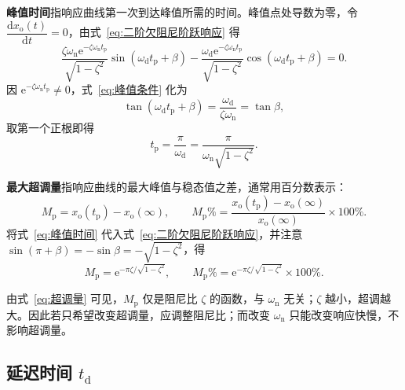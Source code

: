 \textbf{峰值时间}指响应曲线第一次到达峰值所需的时间。峰值点处导数为零，令 $\dfrac{\mathrm{d}x_{\mathrm{o}}(t)}{\mathrm{d}t}=0$，由式~\eqref{eq:二阶欠阻尼阶跃响应} 得
\begin{equation}
\frac{\zeta\omega_{\mathrm{n}}\mathrm{e}^{-\zeta\omega_{\mathrm{n}}t_{\mathrm{p}}}}{\sqrt{1-\zeta^{2}}}
\sin\left(\omega_{\mathrm{d}}t_{\mathrm{p}}+\beta\right)
-\frac{\omega_{\mathrm{d}}\mathrm{e}^{-\zeta\omega_{\mathrm{n}}t_{\mathrm{p}}}}{\sqrt{1-\zeta^{2}}}
\cos\left(\omega_{\mathrm{d}}t_{\mathrm{p}}+\beta\right)=0.
\label{eq:峰值条件}
\end{equation}
因 $\mathrm{e}^{-\zeta\omega_{\mathrm{n}}t_{\mathrm{p}}}\neq0$，式~\eqref{eq:峰值条件} 化为
\[
\tan\left(\omega_{\mathrm{d}}t_{\mathrm{p}}+\beta\right)=\frac{\omega_{\mathrm{d}}}{\zeta\omega_{\mathrm{n}}}=\tan\beta,
\]
取第一个正根即得
\begin{equation}
t_{\mathrm{p}}=\frac{\pi}{\omega_{\mathrm{d}}}=\frac{\pi}{\omega_{\mathrm{n}}\sqrt{1-\zeta^{2}}}.
\label{eq:峰值时间}
\end{equation}

\textbf{最大超调量}指响应曲线的最大峰值与稳态值之差，通常用百分数表示：
\begin{equation}
M_{\mathrm{p}}=x_{\mathrm{o}}\left(t_{\mathrm{p}}\right)-x_{\mathrm{o}}(\infty),
\qquad
M_{\mathrm{p}}\%=\frac{x_{\mathrm{o}}\left(t_{\mathrm{p}}\right)-x_{\mathrm{o}}(\infty)}{x_{\mathrm{o}}(\infty)}\times100\%.
\label{eq:超调量定义}
\end{equation}
将式~\eqref{eq:峰值时间} 代入式~\eqref{eq:二阶欠阻尼阶跃响应}，并注意 $\sin(\pi+\beta)=-\sin\beta=-\sqrt{1-\zeta^{2}}$，得
\begin{equation}
M_{\mathrm{p}}=\mathrm{e}^{-\pi\zeta/\sqrt{1-\zeta^{2}}},
\qquad
M_{\mathrm{p}}\%=\mathrm{e}^{-\pi\zeta/\sqrt{1-\zeta^{2}}}\times100\%.
\label{eq:超调量}
\end{equation}

\begin{keybox}[超调量只与阻尼比有关]
由式~\eqref{eq:超调量} 可见，$M_{\mathrm{p}}$ 仅是阻尼比 $\zeta$ 的函数，与 $\omega_{\mathrm{n}}$ 无关；$\zeta$ 越小，超调越大。因此若只希望改变超调量，应调整阻尼比；而改变 $\omega_{\mathrm{n}}$ 只能改变响应快慢，不影响超调量。
\end{keybox}

\subsection{延迟时间 $t_{\mathrm{d}}$}
\label{sec:延迟时间}

